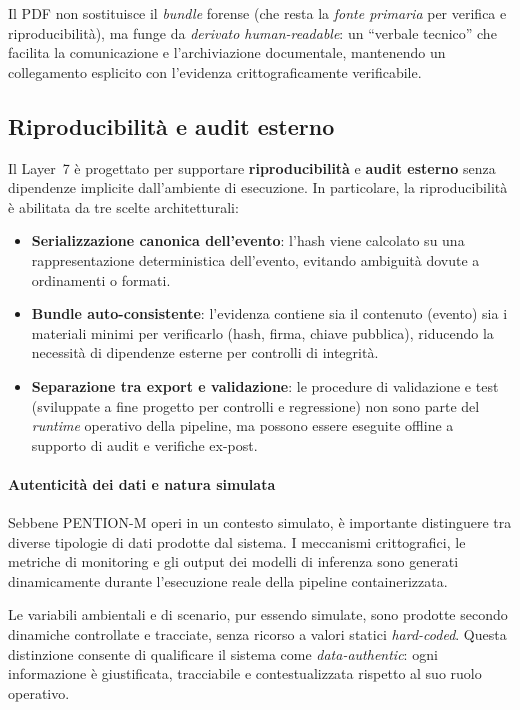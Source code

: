 Il PDF non sostituisce il \textit{bundle} forense (che resta la \emph{fonte primaria} per verifica e riproducibilità), ma funge da \emph{derivato human-readable}: un ``verbale tecnico'' che facilita la comunicazione e l’archiviazione documentale, mantenendo un collegamento esplicito con l’evidenza crittograficamente verificabile.

\subsection{Riproducibilità e audit esterno}

Il Layer~7 è progettato per supportare \textbf{riproducibilità} e \textbf{audit esterno} senza dipendenze implicite dall’ambiente di esecuzione.
In particolare, la riproducibilità è abilitata da tre scelte architetturali:

\begin{itemize}
	\item \textbf{Serializzazione canonica dell’evento}: l’hash viene calcolato su una rappresentazione deterministica dell’evento, evitando ambiguità dovute a ordinamenti o formati.

	\item \textbf{Bundle auto-consistente}: l’evidenza contiene sia il contenuto (evento) sia i materiali minimi per verificarlo (hash, firma, chiave pubblica), riducendo la necessità di dipendenze esterne per controlli di integrità.

	\item \textbf{Separazione tra export e validazione}: le procedure di validazione e test (sviluppate a fine progetto per controlli e regressione) non sono parte del \textit{runtime} operativo della pipeline, ma possono essere eseguite offline a supporto di audit e verifiche ex-post.
\end{itemize}

\paragraph{Autenticità dei dati e natura simulata}

Sebbene \textsc{PENTION-M} operi in un contesto simulato, è importante distinguere tra diverse tipologie di dati prodotte dal sistema.
I meccanismi crittografici, le metriche di monitoring e gli output dei modelli di inferenza sono generati dinamicamente durante l’esecuzione reale della pipeline containerizzata.

Le variabili ambientali e di scenario, pur essendo simulate, sono prodotte secondo dinamiche controllate e tracciate, senza ricorso a valori statici \textit{hard-coded}.
Questa distinzione consente di qualificare il sistema come \emph{data-authentic}: ogni informazione è giustificata, tracciabile e contestualizzata rispetto al suo ruolo operativo.

